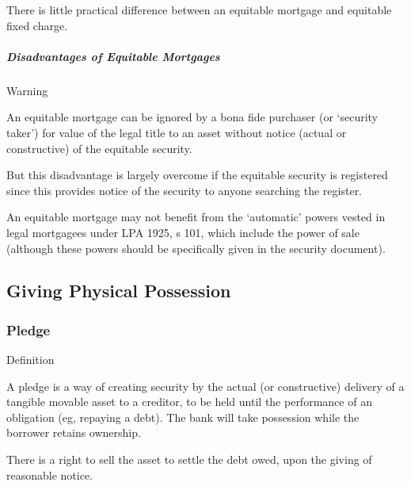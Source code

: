 \documentclass[
]{article}
\newenvironment{env-31409176-8a91-46bb-85fd-48f2d6a04234}
{
    \savenotes\tcolorbox[blanker,breakable,left=5pt,borderline west={2pt}{-4pt}{orange}]
}
{
    \endtcolorbox\spewnotes
}
\newenvironment{env-8872a5c8-2356-4b38-87ff-b8a967f137b3}
{
    \savenotes\tcolorbox[blanker,breakable,left=5pt,borderline west={2pt}{-4pt}{yellow}]
}
{
    \endtcolorbox\spewnotes
}
\begin{document}
There is little practical difference between an equitable mortgage and
equitable fixed charge.

\hypertarget{disadvantages-of-equitable-mortgages}{%
\subparagraph{Disadvantages of Equitable
Mortgages}\label{disadvantages-of-equitable-mortgages}}

\begin{env-31409176-8a91-46bb-85fd-48f2d6a04234}

Warning

An equitable mortgage can be ignored by a bona fide purchaser (or
`security taker') for value of the legal title to an asset without
notice (actual or constructive) of the equitable security.

\end{env-31409176-8a91-46bb-85fd-48f2d6a04234}

But this disadvantage is largely overcome if the equitable security is
registered since this provides notice of the security to anyone
searching the register.

An equitable mortgage may not benefit from the `automatic' powers vested
in legal mortgagees under LPA 1925, s 101, which include the power of
sale (although these powers should be specifically given in the security
document).

\hypertarget{giving-physical-possession}{%
\subsection{Giving Physical
Possession}\label{giving-physical-possession}}

\hypertarget{pledge}{%
\subsubsection{Pledge}\label{pledge}}

\begin{env-8872a5c8-2356-4b38-87ff-b8a967f137b3}

Definition

A pledge is a way of creating security by the actual (or constructive)
delivery of a tangible movable asset to a creditor, to be held until the
performance of an obligation (eg, repaying a debt). The bank will take
possession while the borrower retains ownership.

\end{env-8872a5c8-2356-4b38-87ff-b8a967f137b3}

There is a right to sell the asset to settle the debt owed, upon the
giving of reasonable notice.
\end{document}
